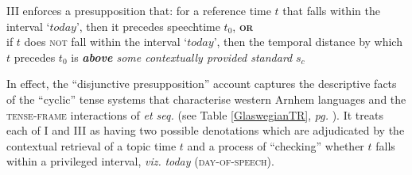 \gls{III} enforces a presupposition that: for a reference time $ t $ that falls within the interval `$ today $', then it precedes speechtime $ t_0 $, \textbf{\textsc{or}}\\ if $ t $ does \textsc{not} fall within the interval `$ today $', then the temporal distance by which $ t $ precedes $ t_0 $ is \textit{\textbf{above} some contextually provided standard} $ s_c $
\xe
%
%
%
%
%
%

In effect, the ``disjunctive presupposition'' account captures the descriptive facts of the ``cyclic'' tense systems that characterise western Arnhem languages and the \textsc{tense-frame} interactions of \citealt{Glasgow1964} \textit{et seq.} (see Table \ref{GlaswegianTR}, \textit{pg.} \pageref{GlaswegianTR}). It treats each of \gls{I} and \gls{III} as having two possible denotations which are adjudicated by the contextual retrieval of a topic time $ t $ and a process of ``checking'' whether $ t $ falls within a privileged interval, \textit{viz.} \textit{today} \textsc{(day-of-speech)}.

